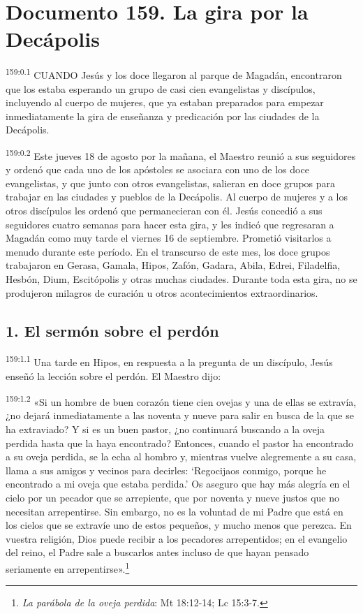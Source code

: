 \chapter{Documento 159. La gira por la Decápolis}
\par
\textsuperscript{159:0.1} CUANDO Jesús y los doce llegaron al parque de Magadán, encontraron que los estaba esperando un grupo de casi cien evangelistas y discípulos, incluyendo al cuerpo de mujeres, que ya estaban preparados para empezar inmediatamente la gira de enseñanza y predicación por las ciudades de la Decápolis.

\par
\textsuperscript{159:0.2} Este jueves 18 de agosto por la mañana, el Maestro reunió a sus seguidores y ordenó que cada uno de los apóstoles se asociara con uno de los doce evangelistas, y que junto con otros evangelistas, salieran en doce grupos para trabajar en las ciudades y pueblos de la Decápolis. Al cuerpo de mujeres y a los otros discípulos les ordenó que permanecieran con él. Jesús concedió a sus seguidores cuatro semanas para hacer esta gira, y les indicó que regresaran a Magadán como muy tarde el viernes 16 de septiembre. Prometió visitarlos a menudo durante este período. En el transcurso de este mes, los doce grupos trabajaron en Gerasa, Gamala, Hipos, Zafón, Gadara, Abila, Edrei, Filadelfia, Hesbón, Dium, Escitópolis y otras muchas ciudades. Durante toda esta gira, no se produjeron milagros de curación u otros acontecimientos extraordinarios.

\section*{1. El sermón sobre el perdón}
\par
\textsuperscript{159:1.1} Una tarde en Hipos, en respuesta a la pregunta de un discípulo, Jesús enseñó la lección sobre el perdón. El Maestro dijo:

\par
\textsuperscript{159:1.2} «Si un hombre de buen corazón tiene cien ovejas y una de ellas se extravía, ¿no dejará inmediatamente a las noventa y nueve para salir en busca de la que se ha extraviado? Y si es un buen pastor, ¿no continuará buscando a la oveja perdida hasta que la haya encontrado? Entonces, cuando el pastor ha encontrado a su oveja perdida, se la echa al hombro y, mientras vuelve alegremente a su casa, llama a sus amigos y vecinos para decirles: `Regocijaos conmigo, porque he encontrado a mi oveja que estaba perdida.' Os aseguro que hay más alegría en el cielo por un pecador que se arrepiente, que por noventa y nueve justos que no necesitan arrepentirse. Sin embargo, no es la voluntad de mi Padre que está en los cielos que se extravíe uno de estos pequeños, y mucho menos que perezca. En vuestra religión, Dios puede recibir a los pecadores arrepentidos; en el evangelio del reino, el Padre sale a buscarlos antes incluso de que hayan pensado seriamente en arrepentirse».\footnote{\textit{La parábola de la oveja perdida}: Mt 18:12-14; Lc 15:3-7.}

